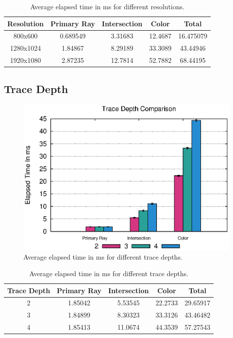 \documentclass{article}
\begin{document}
\begin{table}[h!btp]
\centering
\begin{tabular}{c|c|c|c|c}
    Resolution  & Primary Ray & Intersection & Color & Total \\ [2pt]
\hline
    800x600 & 0.689549 & 3.31683 & 12.4687 & 16.475079 \\
\hline
    1280x1024 & 1.84867 & 8.29189 & 33.3089 & 43.44946 \\
\hline
    1920x1080 & 2.87235 & 12.7814 & 52.7882 & 68.44195 \\
\hline
\end{tabular}
\caption{Average elapsed time in ms for different resolutions. \label{tab:ResultsResolution}}
\end{table}


\subsection{Trace Depth}

\begin{figure}[h!tbp]
\centering
\includegraphics[width=1.0\columnwidth]{Figures/traceDepth.eps}
\caption{Average elapsed time in ms for different trace depths. \label{fig:traceDepth}}
\end{figure}


\begin{table}[h!btp]
\centering
\begin{tabular}{c|c|c|c|c}
    Trace Depth & Primary Ray & Intersection & Color & Total \\ [2pt]
\hline
    2 & 1.85042 & 5.53545 & 22.2733 & 29.65917 \\
\hline
    3 & 1.84899 & 8.30323 & 33.3126 & 43.46482 \\
\hline
    4 & 1.85413 & 11.0674 & 44.3539 & 57.27543 \\
\hline
\end{tabular}
\caption{Average elapsed time in ms for different trace depths. \label{tab:ResultsTraceDepth}}
\end{table}
\end{document}
